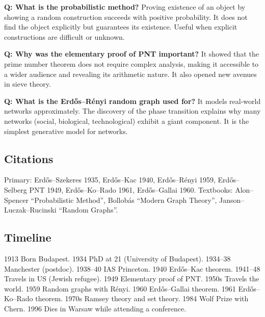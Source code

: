 \noindent\textbf{Q: What is the probabilistic method?} Proving existence of an object by showing a random construction succeeds with positive probability. It does not find the object explicitly but guarantees its existence. Useful when explicit constructions are difficult or unknown.

\noindent\textbf{Q: Why was the elementary proof of PNT important?} It showed that the prime number theorem does not require complex analysis, making it accessible to a wider audience and revealing its arithmetic nature. It also opened new avenues in sieve theory.

\noindent\textbf{Q: What is the Erd\H{o}s--R\'{e}nyi random graph used for?} It models real-world networks approximately. The discovery of the phase transition explains why many networks (social, biological, technological) exhibit a giant component. It is the simplest generative model for networks.

\subsection*{Citations}

Primary: Erd\H{o}s--Szekeres 1935, Erd\H{o}s--Kac 1940, Erd\H{o}s--R\'{e}nyi 1959, Erd\H{o}s--Selberg PNT 1949, Erd\H{o}s--Ko--Rado 1961, Erd\H{o}s--Gallai 1960. Textbooks: Alon--Spencer ``Probabilistic Method'', Bollob\'{a}s ``Modern Graph Theory'', Janson--Luczak--Rucinski ``Random Graphs''.

\subsection*{Timeline}

1913 Born Budapest. 1934 PhD at 21 (University of Budapest). 1934--38 Manchester (postdoc). 1938--40 IAS Princeton. 1940 Erd\H{o}s--Kac theorem. 1941--48 Travels in US (Jewish refugee). 1949 Elementary proof of PNT. 1950s Travels the world. 1959 Random graphs with R\'{e}nyi. 1960 Erd\H{o}s--Gallai theorem. 1961 Erd\H{o}s--Ko--Rado theorem. 1970s Ramsey theory and set theory. 1984 Wolf Prize with Chern. 1996 Dies in Warsaw while attending a conference.

